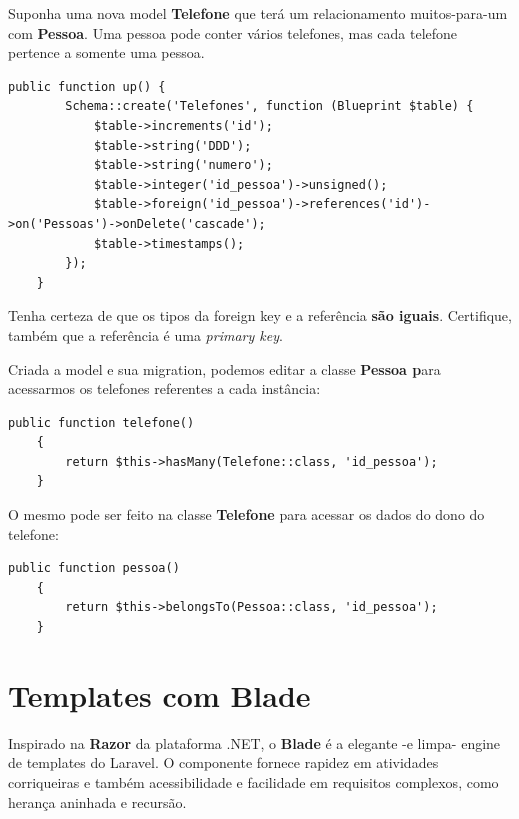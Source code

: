\documentclass[
12pt,				%
openany,			%
twoside,			%
a4paper,			%
english,			%
french,				%
spanish,			%
brazil,				%
]{abntex2}
\begin{document}
Suponha uma nova model \textbf{Telefone} que terá um relacionamento muitos-para-um com
\textbf{Pessoa}. Uma pessoa pode conter vários telefones, mas cada telefone pertence a somente
uma pessoa.


\begin{lstlisting}[style=php,caption={\textit{Arquivo de migration exemplo 2}}]
    public function up() {
        Schema::create('Telefones', function (Blueprint $table) {
            $table->increments('id');
            $table->string('DDD');
            $table->string('numero');
            $table->integer('id_pessoa')->unsigned();
            $table->foreign('id_pessoa')->references('id')->on('Pessoas')->onDelete('cascade');
            $table->timestamps();
        });
    }
\end{lstlisting}

\begin{leftbar}
    Tenha certeza de que os tipos da foreign key e a referência \textbf{são iguais}. Certifique, também que a referência é uma \textit{primary key}.
\end{leftbar}

Criada a model e sua migration, podemos editar a classe \textbf{Pessoa p}ara acessarmos os telefones referentes a cada instância:

\begin{lstlisting}[style=php,caption={\textit{app/Pessoa.php}}]
    public function telefone() 
    {
        return $this->hasMany(Telefone::class, 'id_pessoa');
    }
\end{lstlisting}

O mesmo pode ser feito na classe \textbf{Telefone} para acessar os dados do dono do telefone:

\begin{lstlisting}[style=php,caption={\textit{app/Telefone.php}}]
    public function pessoa() 
    {
        return $this->belongsTo(Pessoa::class, 'id_pessoa');
    }
\end{lstlisting}

\section{Templates com Blade}

Inspirado na \textbf{Razor} da plataforma .NET, o \textbf{Blade} é a elegante -e limpa- engine de templates
do Laravel. O componente fornece rapidez em atividades corriqueiras e também acessibilidade e facilidade em requisitos complexos, como herança aninhada e recursão.
\end{document}
